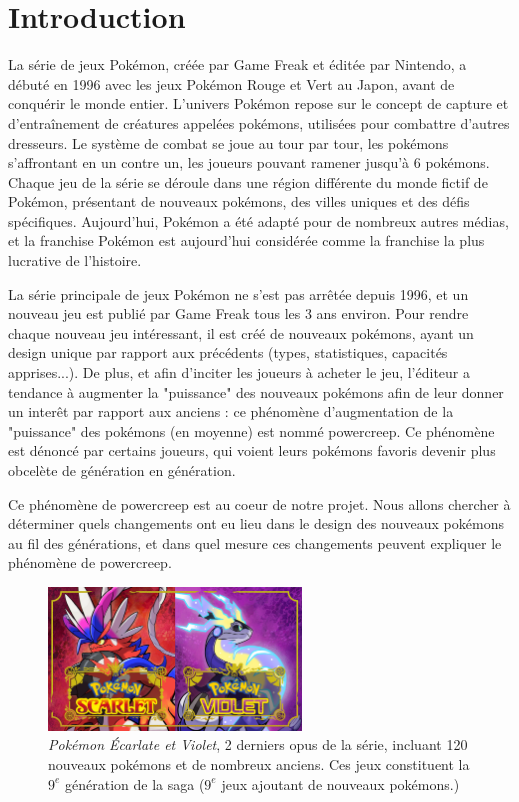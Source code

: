 \documentclass[a4paper,12pt]{article}
\begin{document}
\section{Introduction}
La série de jeux Pokémon, créée par Game Freak et éditée par Nintendo, a débuté
en 1996 avec les jeux Pokémon Rouge et Vert au Japon, avant de conquérir le
monde entier. L'univers Pokémon repose sur le concept de capture et
d'entraînement de créatures appelées pokémons, utilisées pour combattre d'autres
dresseurs. Le système de combat se joue au tour par tour, les pokémons
s'affrontant en un contre un, les joueurs pouvant ramener jusqu'à 6 pokémons.
Chaque jeu de la série se déroule dans une région différente du monde fictif de
Pokémon, présentant de nouveaux pokémons, des villes uniques et des défis
spécifiques. Aujourd'hui, Pokémon a été adapté pour de nombreux autres médias,
et la franchise Pokémon est aujourd'hui considérée comme la franchise la plus
lucrative de l'histoire.

La série principale de jeux Pokémon ne s'est pas arrêtée depuis 1996, et un
nouveau jeu est publié par Game Freak tous les 3 ans environ. Pour rendre chaque
nouveau jeu intéressant, il est créé de nouveaux pokémons, ayant un design
unique par rapport aux précédents (types, statistiques, capacités apprises...).
De plus, et afin d'inciter les joueurs à acheter le jeu, l'éditeur a tendance à
augmenter la "puissance" des nouveaux pokémons afin de leur donner un interêt
par rapport aux anciens : ce phénomène d'augmentation de la "puissance" des
pokémons (en moyenne) est nommé powercreep. Ce phénomène est dénoncé par
certains joueurs, qui voient leurs pokémons favoris devenir plus obcelète de
génération en génération. 

Ce phénomène de powercreep est au coeur de notre projet. Nous allons chercher à
déterminer quels changements ont eu lieu dans le design des nouveaux pokémons au
fil des générations, et dans quel mesure ces changements peuvent expliquer le
phénomène de powercreep.

\begin{figure}[!h]
    \centering
    \includegraphics[width=0.6\textwidth]{Image/scarlet-violet.jpg}
    \caption{\textit{Pokémon Écarlate et Violet}, 2 derniers opus de la série,
    incluant 120 nouveaux pokémons et de nombreux anciens. Ces jeux constituent
    la $9^{e}$ génération de la saga ($9^{e}$  jeux ajoutant de nouveaux
    pokémons.)}
    \label{fig:image2}
\end{figure}
\end{document}
